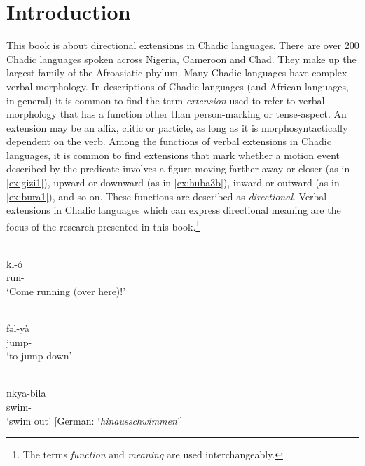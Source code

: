 \chapter{Introduction} \label{ch:introduction}

This book is about directional extensions in Chadic languages. There are over 200 Chadic languages spoken across Nigeria, Cameroon and Chad. They make up the largest family of the Afroasiatic phylum. Many Chadic languages have complex verbal morphology. In descriptions of Chadic languages (and African languages, in general) it is common to find the term \textit{extension} used to refer to verbal morphology that has a function other than person-marking or tense-aspect. An extension may be an affix, clitic or particle, as long as it is morphosyntactically dependent on the verb. Among the functions of verbal extensions in Chadic languages, it is common to find extensions that mark whether a motion event described by the predicate involves a figure moving farther away or closer (as in \ref{ex:gizi1}), upward or downward (as in \ref{ex:huba3b}), inward or outward (as in \ref{ex:bura1}), and so on. These functions are described as \textit{directional}. Verbal extensions in Chadic languages which can express directional meaning are the focus of the research presented in this book.\footnote{The terms \textit{function} and \textit{meaning} are used interchangeably.} 

\ea\label{ex:gizi1}
 \\
\gll kl-ó	\\
run- \\
\glt `Come running (over here)!'

\ex\label{ex:huba3b}
 \\
\gll fəl-yà \\
jump- \\
\glt `to jump down'

\ex\label{ex:bura1}
 \\
\gll nkya-bila \\
swim- \\
\glt `swim out' [German: `\textit{hinausschwimmen}']
\z

